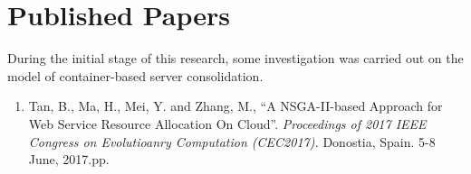 \section{Published Papers}

During the initial stage of this research, some investigation 
was carried out on the model of container-based server consolidation. 

\begin{enumerate}
	\item Tan, B., Ma, H., Mei, Y. and Zhang, M., ``A NSGA-II-based Approach for Web Service Resource Allocation On Cloud''. \textit{
	Proceedings of 2017 IEEE Congress on Evolutioanry Computation (CEC2017). } Donostia, Spain. 5-8 June, 2017.pp. 
\end{enumerate}

